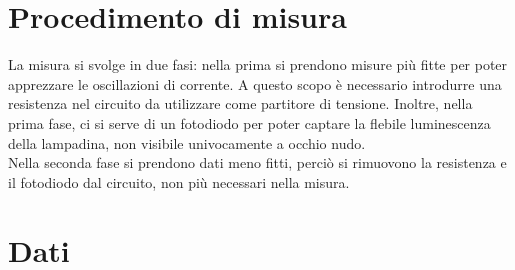 \documentclass[10pt,twocolumn]{article}
\begin{document}
\section{Procedimento di misura}
La misura si svolge in due fasi: nella prima si prendono misure più fitte
per poter apprezzare le oscillazioni di corrente. A questo scopo è necessario
introdurre una resistenza nel circuito da utilizzare come partitore di tensione.
Inoltre, nella prima fase, ci si serve di un fotodiodo per poter captare la 
flebile luminescenza della lampadina, non visibile univocamente a occhio nudo.\\
Nella seconda fase si prendono dati meno fitti, perciò si rimuovono la 
resistenza e il fotodiodo dal circuito, non più necessari nella misura.

\section{Dati}
\end{document}
